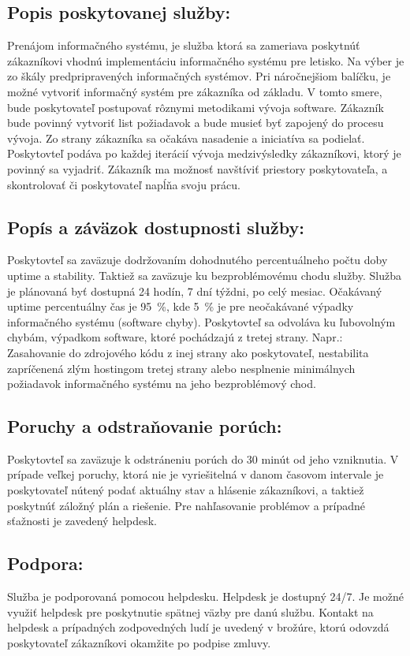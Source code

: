 \documentclass[a4paper, 11pt]{article}
\begin{document}
\begin{center}
\subsection*{Popis poskytovanej služby:}
Prenájom informačného systému, je služba ktorá sa zameriava poskytnúť zákazníkovi vhodnú implementáciu informačného systému pre letisko. Na výber je zo škály predpripravených informačných systémov.
Pri náročnejšiom balíčku, je možné vytvoriť informačný systém pre zákazníka od základu. V tomto smere, bude poskytovateľ postupovať rôznymi metodikami vývoja software. Zákazník bude povinný vytvoriť
list požiadavok a bude musieť byť zapojený do procesu vývoja. Zo strany zákazníka sa očakáva nasadenie a iniciatíva sa podielať. Poskytovteľ podáva po každej iterácií vývoja medzivýsledky zákazníkovi, 
ktorý je povinný sa vyjadriť. Zákazník ma možnosť navštíviť priestory poskytovateľa, a skontrolovať či poskytovateľ napĺňa svoju prácu.

\subsection*{Popís a záväzok dostupnosti služby:}
Poskytovteľ sa zaväzuje dodržovaním dohodnutého percentuálneho počtu doby uptime a stability. Taktiež sa zaväzuje ku bezproblémovému chodu služby. Služba je plánovaná byť dostupná 24 hodín, 7 dní 
týždni, po celý mesiac. Očakávaný uptime percentuálny čas je 95~\%, kde 5~\% je pre neočakávané výpadky informačného systému (software chyby). Poskytovteľ sa odvoláva ku ľubovolným chybám, výpadkom 
software, ktoré pochádzajú z tretej strany. Napr.: Zasahovanie do zdrojového kódu z inej strany ako poskytovateľ, nestabilita zapríčenená zlým hostingom tretej strany alebo nesplnenie minimálnych
požiadavok informačného systému na jeho bezproblémový chod.

\subsection*{Poruchy a odstraňovanie porúch:}
Poskytovteľ sa zaväzuje k odstráneniu porúch do 30 minút od jeho vzniknutia. V prípade veľkej poruchy, ktorá nie je vyriešitelná v danom časovom intervale je poskytovateľ nútený podať aktuálny stav 
a hlásenie zákazníkovi, a taktiež poskytnúť záložný plán a riešenie. Pre nahľasovanie problémov a prípadné sťažnosti je zavedený helpdesk.

\subsection*{Podpora:}
Služba je podporovaná pomocou helpdesku. Helpdesk je dostupný 24/7. Je možné využiť helpdesk pre poskytnutie spätnej väzby pre danú službu. Kontakt na helpdesk a prípadných zodpovedných ludí
je uvedený v brožúre, ktorú odovzdá poskytovateľ zákazníkovi okamžite po podpise zmluvy.


\end{center}
\end{document}
